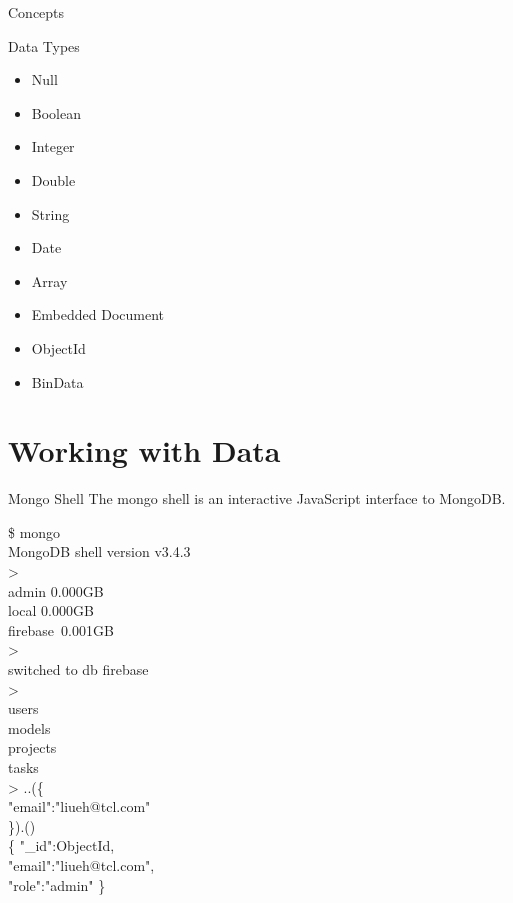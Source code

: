 \documentclass{beamer}
\begin{document}
\begin{frame}{Concepts}
	
\end{frame}

\begin{frame}{Data Types}
    \begin{itemize}
        \item Null
        \item Boolean
        \item Integer
        \item Double
        \item String
        \item Date
        \item Array
        \item Embedded Document
        \item ObjectId
        \item BinData
    \end{itemize}
\end{frame}

\section{Working with Data}
\begin{frame}{Mongo Shell}
    The mongo shell is an interactive JavaScript interface to MongoDB. 
    \begin{minipage}[t]{0.5\textwidth}
    	\scriptsize
    	\begin{Alms*}
    		\$ mongo \\
    		MongoDB shell version v3.4.3 \\
    		>   \\
    		admin \qquad 0.000GB\\
    		local \qquad 0.000GB\\
    		firebase \,0.001GB\\
    		>   \\
    		switched to db firebase \\
    		>   \\
    		users \\
    		models \\
    		projects \\
    		tasks \\
    		> ..(\{\\
    		"email":"liueh@tcl.com"\\
    		\}).() \\
    		\{ \NI
    		"\_id":ObjectId, \\
    		"email":"liueh@tcl.com", \\
    		"role":"admin"
    		\ND \}
    	\end{Alms*}
    \end{minipage}
\end{frame}
\end{document}
